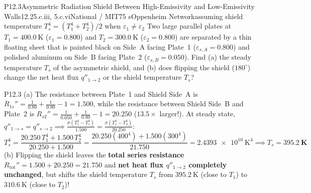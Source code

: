 \begin{problem}{P12.3}{Asymmetric Radiation Shield Between High-Emissivity and Low-Emissivity Walls}{12.2}{5.c.iii, 5.c.vi}{National / MIT}{75 s}{Oppenheim Network}{assuming shield temperature $T_s^4 = (T_1^4+T_2^4)/2$ when $\varepsilon_1 \ne \varepsilon_2$}
Two large parallel plates at $T_1 = \SI{400.0}{\kelvin}$ ($\varepsilon_1 = 0.800$) and $T_2 = \SI{300.0}{\kelvin}$ ($\varepsilon_2 = 0.800$) are separated by a thin floating sheet that is painted black on Side~A facing Plate~1 ($\varepsilon_{s,A} = 0.800$) and polished aluminum on Side~B facing Plate~2 ($\varepsilon_{s,B} = 0.050$). Find (a) the steady temperature $T_s$ of the asymmetric shield, and (b) does flipping the shield ($180^\circ$) change the net heat flux $q''_{1\to 2}$ or the shield temperature $T_s$?
\end{problem}
\begin{solution}{P12.3}
(a) The resistance between Plate~1 and Shield Side~A is $R_{1s}'' = \frac{1}{0.80} + \frac{1}{0.80} - 1 = \mathbf{1.500}$, while the resistance between Shield Side~B and Plate~2 is $R_{s2}'' = \frac{1}{0.050} + \frac{1}{0.80} - 1 = \mathbf{20.250}$ ($13.5\times$ larger!). At steady state, $q''_{1\to s} = q''_{s\to 2} \implies \frac{\sigma(T_1^4 - T_s^4)}{1.500} = \frac{\sigma(T_s^4 - T_2^4)}{20.250}$:
\[
  T_s^4 = \frac{20.250\,T_1^4 + 1.500\,T_2^4}{20.250 + 1.500} = \frac{20.250(400^4) + 1.500(300^4)}{21.750} = \num{2.4393e10}\ \si{\kelvin\tothe{4}} \implies T_s = \mathbf{\SI{395.2}{\kelvin}}
\]
(b) Flipping the shield leaves the \textbf{total series resistance} $R_{\mathrm{tot}}'' = 1.500 + 20.250 = 21.750$ and \textbf{net heat flux $q''_{1\to 2}$ completely unchanged}, but shifts the shield temperature $T_s$ from $\SI{395.2}{\kelvin}$ (close to $T_1$) to $\SI{310.6}{\kelvin}$ (close to $T_2$)!
\end{solution}

